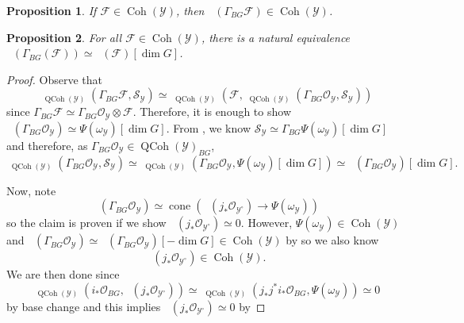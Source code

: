 \documentclass[10pt,a4paper]{amsart}
\newtheorem{prop}{Proposition}
\DeclareMathOperator{\Coh}{\catfont{Coh}}
\DeclareMathOperator{\Dmat}{\mathbb{D}^{\mathrm{Mat}}}
\DeclareMathOperator{\Dse}{\mathbb{D}^{\mathrm{Se}}}
\newcommand{\F}{\mathcal{F}}
\renewcommand{\O}{\mathcal{O}}
\DeclareMathOperator{\QCoh}{\catfont{QCoh}}
\renewcommand{\S}{\mathcal{S}}
\newcommand{\Y}{\mathcal{Y}}
\newcommand{\catfont}{\mathrm}
\DeclareMathOperator{\cone}{cone}
\newcommand{\localcoh}{\Gamma_{BG}}
\newcommand{\punct}[1]{{#1}^\circ}
\DeclareMathOperator{\uHom}{\underline{\mathcal{H}om}}
\begin{document}
  \begin{prop}\label{prop:dloc_coh}
    If \(\F \in \Coh(\Y)\), then \(\Dmat(\localcoh \F) \in \Coh(\Y)\).
  \end{prop}

  \begin{prop}\label{prop:dmat_coh_se}
    For all \(\F \in \Coh(\Y)\), there is a natural equivalence \(\Dmat(\localcoh(\F)) \simeq \Dse(\F)[\dim G]\).
  \end{prop}

  \begin{proof}
    Observe that 
    \begin{displaymath}
      \uHom_{\QCoh(\Y)}(\localcoh \F, \S_\Y) \simeq \uHom_{\QCoh(\Y)}(\F, \uHom_{\QCoh(\Y)}(\localcoh \O_\Y, \S_\Y))
    \end{displaymath}
    since \(\localcoh \F \simeq \localcoh \O_\Y \otimes \F\). Therefore, it
    is enough to show \(\Dmat(\localcoh \O_\Y) \simeq \Psi(\omega_\Y)[\dim G]\).
    From , we know \(\S_\Y \simeq \localcoh \Psi(\omega_\Y)[\dim G]\)
    and therefore, as \(\localcoh \O_\Y \in \QCoh(\Y)_{BG}\),
    \begin{displaymath}
      \uHom_{\QCoh(\Y)}(\localcoh \O_\Y, \S_\Y) \simeq \uHom_{\QCoh(\Y)}(\localcoh \O_\Y, \Psi(\omega_\Y)[\dim G]) \simeq \Dse(\localcoh \O_\Y)[\dim G].
    \end{displaymath}

    Now, note
    \begin{displaymath}
      \Dse(\localcoh \O_\Y) \simeq \cone(\Dse(j_\ast \O_{\punct{\Y}}) \to \Psi(\omega_\Y))
    \end{displaymath}
    so the claim is proven if we show \(\Dse (j_\ast \O_{\punct{\Y}})\simeq 0\).
    However, \(\Psi(\omega_\Y) \in \Coh(\Y)\) and \(\Dse(\localcoh \O_\Y) \simeq \Dmat(\localcoh \O_\Y)[-\dim G] \in \Coh(\Y)\)
    by  so we also know 
    \begin{displaymath}
      \Dse(j_\ast \O_{\punct{\Y}}) \in \Coh(\Y).
    \end{displaymath}
    We are then done since
    \begin{displaymath}
      \uHom_{\QCoh(\Y)}(i_\ast \O_{BG}, \Dse(j_\ast \O_{\punct{\Y}})) \simeq \uHom_{\QCoh(\Y)}(j_\ast j^\ast i_\ast \O_{BG}, \Psi(\omega_\Y)) \simeq 0
    \end{displaymath}
    by base change and this implies \(\Dse(j_\ast \O_{\punct{\Y}}) \simeq 0\) by 
  \end{proof}
\end{document}
